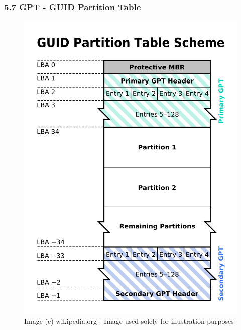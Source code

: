 \begin{frame}[fragile]
  \frametitle{5.7 GPT - GUID Partition Table}
    \begin{figure}
        \caption[]{\tiny Image (c) wikipedia.org - Image used solely for illustration purposes}
	    \includegraphics[scale=0.23,angle=270]{images/gpt.png}
        \captionsetup{labelformat=empty,labelsep=none}
    \end{figure}
\end{frame}


